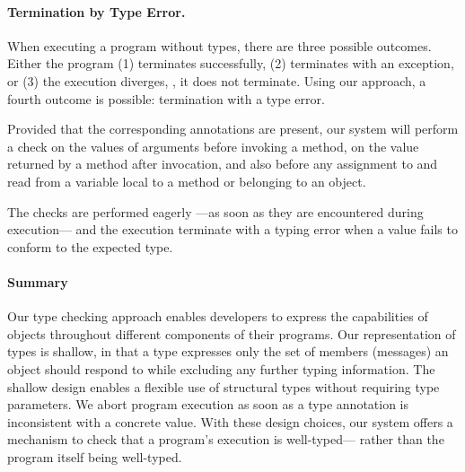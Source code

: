 

\paragraph{Termination by Type Error.}
\label{sec:term-type-error}

When executing a program without types, there are three possible outcomes.
Either the program (1) terminates successfully,
(2) terminates with an exception, or 
(3) the execution diverges, \ie, it does not terminate.
Using our approach, a
fourth outcome is possible: termination with a type error.

Provided that the corresponding annotations are present, 
our system will perform a check
on the values of arguments before invoking a method, 
on the value returned by a method after invocation, and
also before any assignment to and read from a variable local to
a method or belonging to an object. 

The checks are performed eagerly%
---as soon as they are encountered during execution---%
and the execution terminate with a typing error 
when a value fails to conform to the expected type.

\paragraph{Summary}
Our type checking approach enables developers to express
the capabilities of objects throughout different components of 
their programs.
Our representation of types is shallow,
in that a type expresses only the set of members (messages) an object
should respond to while excluding any further typing information. 
The shallow design enables a flexible use of structural types without
requiring type parameters.
We abort program execution as soon as
a type annotation is inconsistent with a concrete value. 
With these design choices, our system offers a mechanism to check that a program's execution
is well-typed---%
rather than the program itself being well-typed.

